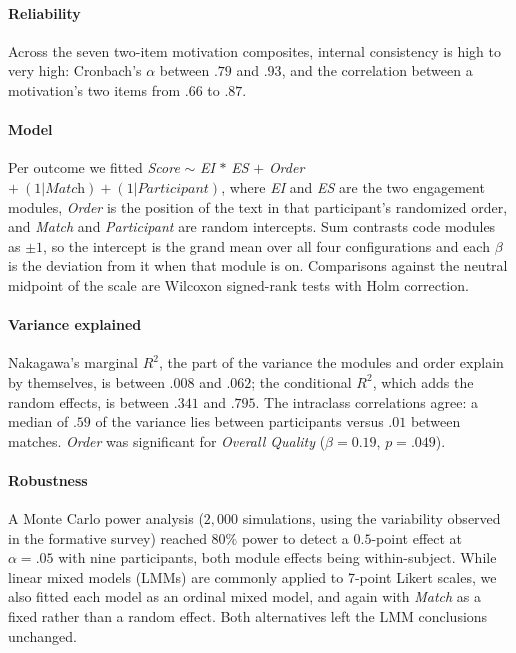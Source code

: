 \documentclass[11pt]{article}
\begin{document}
\paragraph{Reliability}
Across the seven two-item motivation composites, internal consistency is high to very high: Cronbach's $\alpha$ between $.79$ and $.93$, and the correlation between a motivation's two items from $.66$ to $.87$.

\paragraph{Model}
Per outcome we fitted \textit{Score} $\sim$ \textit{EI} $*$ \textit{ES} $+$ \textit{Order} $+\ (1|\textit{Match}) + (1|\textit{Participant})$, where \textit{EI} and \textit{ES} are the two engagement modules, \textit{Order} is the position of the text in that participant's randomized order, and \textit{Match} and \textit{Participant} are random intercepts. Sum contrasts code modules as $\pm 1$, so the intercept is the grand mean over all four configurations and each $\beta$ is the deviation from it when that module is on. Comparisons against the neutral midpoint of the scale are Wilcoxon signed-rank tests with Holm correction.

\paragraph{Variance explained}
Nakagawa's marginal $R^2$, the part of the variance the modules and order explain by themselves, is between $.008$ and $.062$; the conditional $R^2$, which adds the random effects, is between $.341$ and $.795$. The intraclass correlations agree: a median of $.59$ of the variance lies between participants versus $.01$ between matches. \textit{Order} was significant for \emph{Overall Quality} ($\beta=0.19$, $p=.049$).

\paragraph{Robustness}
A Monte Carlo power analysis ($2{,}000$ simulations, using the variability observed in the formative survey) reached $80\%$ power to detect a $0.5$-point effect at $\alpha=.05$ with nine participants, both module effects being within-subject. While linear mixed models (LMMs) are commonly applied to 7-point Likert scales, we also fitted each model as an ordinal mixed model, and again with \textit{Match} as a fixed rather than a random effect. Both alternatives left the LMM conclusions unchanged.
\end{document}
